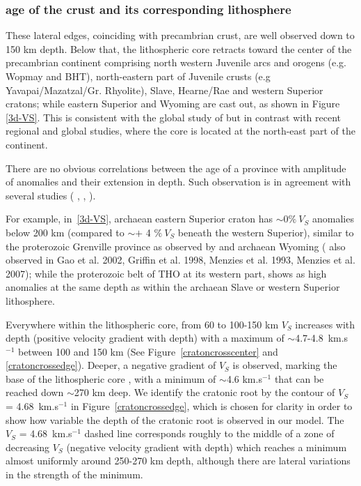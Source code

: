 \documentclass[12pt]{article}
\begin{document}
		\subsubsection{age of the crust and its corresponding lithosphere}
		These lateral edges, coinciding with precambrian crust, are well observed down to 150 km depth. 
		Below that, the lithospheric core retracts toward the center of the precambrian continent comprising north western Juvenile arcs and orogens (e.g. Wopmay and BHT), north-eastern part of Juvenile crusts (e.g Yavapai/Mazatzal/Gr. Rhyolite), Slave, Hearne/Rae and western Superior cratons; while eastern Superior and Wyoming are cast out, as shown in Figure \ref{3d-VS}. 
		This is consistent with the global study of \cite{bozdag2016global} but in contrast with recent regional \cite[e.g.][]{yuan2014lithospheric,yuan20113,schaeffer2014imaging,nettles2008radially} and global \cite[e.g][]{french2014whole,french200} studies, where the core is located at the north-east part of the continent.

		There are no obvious correlations between the age of a province with amplitude of anomalies and their extension in depth. Such observation is in agreement with several studies ( \cite[e.g for Baltic shield study][]{bruneton2004complex}, \cite[for Australian shield][]{fishwick2005contrasts},\cite[e.g for north American shield study][]{villemaire2012p,darbyshire2013seismic,porritt2015lithospheric} ).

		For example, in~\ref{3d-VS}, archaean eastern Superior craton has $\sim 0\% \: V_S$ anomalies below 200 km (compared to $\sim+$ 4 $\%\:V_S$ beneath the western Superior), similar to the proterozoic Grenville province as observed by \cite{villemaire2012p,bozdag2016global} and archaean Wyoming ( also observed in Gao et al. 2002, Griffin et al. 1998, Menzies et al. 1993, Menzies et al. 2007); while the proterozoic belt of THO at its western part, shows as high anomalies at the same depth as within the archaean Slave or western Superior lithosphere. 
		
		Everywhere within the lithospheric core, from 60 to 100-150 km $V_S$ increases with depth (positive velocity gradient with depth) with a maximum of $\sim$4.7-4.8~km.s$^{-1}$ between 100 and 150 km (See Figure~\ref{cratoncrosscenter} and \ref{cratoncrossedge}).
		Deeper, a negative gradient of $V_S$ is observed, marking the base of the lithospheric core \citep{eaton2009elusive}, with a minimum of $\sim$4.6 km.s$^{-1}$ that can be reached down $\sim$270 km deep.
		We identify the cratonic root by the contour of $V_S$ = 4.68~km.s$^{-1}$ in Figure~\ref{cratoncrossedge}, which is chosen for clarity in order to show how variable the depth of the cratonic root is observed in our model.
		The $V_S$ = 4.68~km.s$^{-1}$ dashed line corresponds roughly to the middle of a zone of decreasing $V_S$ (negative velocity gradient with depth) which reaches a minimum almost uniformly around 250-270 km depth, although there are lateral variations in the strength of the minimum.
		
\end{document}
